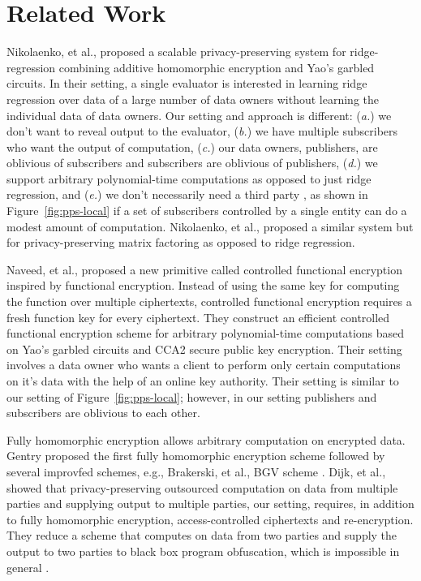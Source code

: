 \section{Related Work}
\label{sec:related}

Nikolaenko, et al., \cite{nikolaenko2013privacy} proposed a scalable
privacy-preserving system for ridge-regression combining additive homomorphic
encryption and Yao's garbled circuits.  In their setting, a single evaluator is
interested in learning ridge regression over data of a large number of data
owners without learning the individual data of data owners. Our setting and
approach is different: (\emph{a.}) we don't want to reveal output to the
evaluator, (\emph{b.}) we have multiple subscribers who want the output of
computation, (\emph{c.}) our data owners, publishers, are oblivious of
subscribers and subscribers are oblivious of publishers, (\emph{d.}) we support
arbitrary polynomial-time computations as opposed to just ridge regression, and
(\emph{e.}) we don't necessarily need a third party \garbler, as shown in
Figure~\ref{fig:pps-local} if a set of subscribers controlled by a single
entity can do a modest amount of computation. Nikolaenko, et
al.,\cite{nikolaenko2013privacy} proposed a similar system but for
privacy-preserving matrix factoring as opposed to ridge regression.

Naveed, et al., \cite{naveed2014controlled} proposed a new primitive called
controlled functional encryption inspired by functional encryption. Instead of
using the same key for computing the function over multiple ciphertexts,
controlled functional encryption requires a fresh function key for every
ciphertext. They construct an efficient controlled functional encryption scheme
for arbitrary polynomial-time computations based on Yao's garbled circuits and
CCA2 secure public key encryption. Their setting involves a data owner who
wants a client to perform only certain computations on it's data with the help
of an online key authority. Their setting is similar to our setting of
Figure~\ref{fig:pps-local}; however, in our setting publishers and subscribers
are oblivious to each other.

Fully homomorphic encryption allows arbitrary computation on encrypted data.
Gentry proposed the first fully homomorphic encryption
scheme \cite{brakerski2011fully,gentry2009fully} followed by several
improvfed schemes, e.g., Brakerski, et al., BGV scheme
\cite{brakerski2014leveled}. Dijk, et al., \cite{van2010impossibility}
showed that privacy-preserving outsourced computation on data from multiple
parties and supplying output to multiple parties, our setting, requires, in
addition to fully homomorphic encryption, access-controlled ciphertexts and
re-encryption. They reduce a scheme that computes on data from two parties
and supply the output to two parties to black box program obfuscation, which
is impossible in general \cite{barak2001possibility}.
